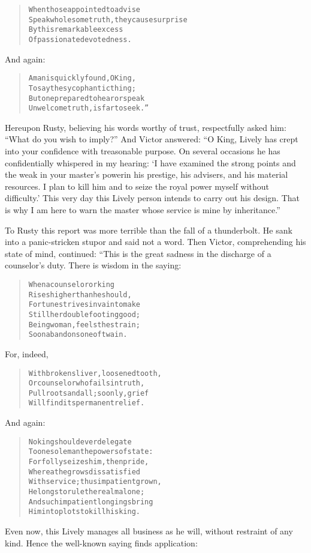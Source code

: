 \documentclass[article, twoside, 14pt]{memoir}
\renewenvironment{verbatim}{%
\begin{quote}%
\vskip -10pt%
\begin{alltt}\normalfont\large}{\end{alltt}%
\end{quote}%
\vskip -10pt
} %
\begin{document}
\begin{verbatim}
When those appointed to advise
Speak wholesome truth, they cause surprise
By this remarkable excess
Of passionate devotedness.
\end{verbatim}
And again:

\begin{verbatim}
A man is quickly found, O King,
To say the sycophantic thing;
But one prepared to hear or speak
Unwelcome truth, is far to seek.”
\end{verbatim}
Hereupon Rusty, believing his words worthy of trust, respectfully
asked him: ``What do you wish to imply?'' And Victor answered:
``O King, Lively has crept into your confidence with treasonable purpose. On several occasions he has confidentially whispered in my hearing: `I have examined the strong points and the weak in your master's power{\textemdash}in his prestige, his advisers, and his material resources. I plan to kill him and to seize the royal power myself without difficulty.' This very day this Lively person intends to carry out his design. That is why I am here to warn the master whose service is mine by inheritance.''

To Rusty this report was more terrible than the fall of a
thunderbolt. He sank into a panic-stricken stupor and said not a
word. Then Victor, comprehending his state of mind, continued:
“This is the great sadness in the discharge of a counselor's duty.
There is wisdom in the saying:

\begin{verbatim}
When a counselor or king
    Rises higher than he should,
Fortune strives in vain to make
    Still her double footing good;
Being woman, feels the strain;
Soon abandons one of twain.
\end{verbatim}
For, indeed,

\begin{verbatim}
With broken sliver, loosened tooth,
Or counselor who fails in truth,
Pull roots and all; so only, grief
Will find its permanent relief.
\end{verbatim}
And again:

\begin{verbatim}
No king should ever delegate
To one sole man the powers of state:
For folly seizes him, then pride,
Whereat he grows dissatisfied
With service; thus impatient grown,
He longs to rule the realm alone;
And such impatient longings bring
Him into plots to kill his king.
\end{verbatim}
Even now, this Lively manages all business as he will, without
restraint of any kind. Hence the well-known saying finds
application:
\end{document}

